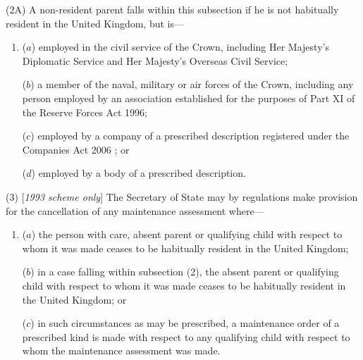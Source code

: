 \documentclass[12pt,a4paper]{article}
\begin{document}
(2A) A non-resident parent falls within this subsection if he is not habitually resident in the United Kingdom, but is—
\begin{enumerate}\item[]
($a$) employed in the civil service of the Crown, including Her Majesty’s Diplomatic Service and Her Majesty’s Overseas Civil Service;

($b$) a member of the naval, military or air forces of the Crown, including any person employed by an association established for the purposes of Part XI of the Reserve Forces Act 1996;

($c$) employed by a company of a prescribed description 
registered under the Companies Act 2006%
; or

($d$) employed by a body of a prescribed description.
\end{enumerate}

(3) [\emph{1993 scheme only}] The Secretary of State may by regulations make provision for the cancellation of any maintenance assessment where—
\begin{enumerate}\item[]
($a$) the person with care, absent parent or qualifying child with respect to whom it was made ceases to be habitually resident in the United Kingdom;

($b$) in a case falling within subsection (2), the absent parent or qualifying child with respect to whom it was made ceases to be habitually resident in the United Kingdom; or

($c$) in such circumstances as may be prescribed, a maintenance order of a prescribed kind is made with respect to any qualifying child with respect to whom the maintenance assessment was made.
\end{enumerate}

\end{document}
